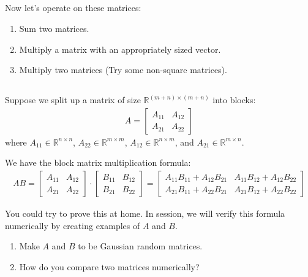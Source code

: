 \documentclass[11pt,letterpaper]{report}
\begin{document}
\subsection{}
Now let's operate on these matrices:
\begin{enumerate}
    \item Sum two matrices.
    \item Multiply a matrix with an appropriately sized vector.
    \item Multiply two matrices (Try some non-square matrices).
\end{enumerate}

\subsection{}
Suppose we split up a matrix of size $\mathbb{R}^{(m+n)\times(m+n)}$ into blocks:
\begin{align*}
    A = \left[\begin{array}{c|c} A_{11} & A_{12} \\\hline A_{21} & A_{22} \end{array}\right]
\end{align*}
where $A_{11}\in\mathbb{R}^{n\times n}$, $A_{22}\in\mathbb{R}^{m\times m}$, $A_{12}\in\mathbb{R}^{n\times m}$, and $A_{21}\in\mathbb{R}^{m\times n}$. 

We have the block matrix multiplication formula:
\begin{align*}
    AB = \left[
\begin{array}{c|c} A_{11} & A_{12} \\\hline A_{21} & A_{22} \end{array} \right]\cdot
\left[
\begin{array}{c|c} B_{11} & B_{12} \\\hline B_{21} & B_{22} \end{array} \right]
= 
\left[
\begin{array}{c|c} A_{11}B_{11}+A_{12}B_{21} & A_{11}B_{12}+A_{12}B_{22} \\\hline A_{21}B_{11}+A_{22}B_{21} & A_{21}B_{12}+A_{22}B_{22} \end{array} \right]
\end{align*}

You could try to prove this at home. In session, we will verify this formula numerically by creating examples of $A$ and $B$.

\begin{enumerate}
    \item Make $A$ and $B$ to be Gaussian random matrices.
    \item How do you compare two matrices numerically?
\end{enumerate}
\end{document}
